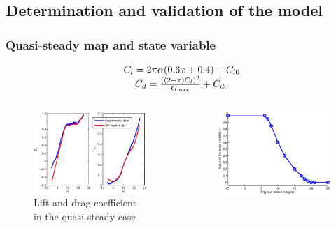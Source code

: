 \documentclass[compress]{beamer}
\begin{document}
\subsection{Determination and validation of the model}

\begin{frame}
  \frametitle{Quasi-steady map and state variable}
  \begin{equation*}
    \begin{array}[c]{c}
      C_l=2 \pi \alpha (0.6 x + 0.4) + C_{l0} \\
      C_d= \frac{ \left( \left( 2 - x \right)C_l \right)^2 }{G_{\max}} + C_{d0}
    \end{array}
  \end{equation*}
  \begin{columns}
    \begin{figure}[h]
      \begin{center}
	\includegraphics[width=1\textwidth]{./Figures/Cd_and_Cl_NACA0009.eps}
      \end{center}
      \caption{Lift and drag coefficient in the quasi-steady case}
    \end{figure}
    \begin{figure}[ht]
      \begin{center}
	\includegraphics[width=1\textwidth]{./Figures/x_0_vs_alpha.eps}

\end{center}
\end{figure}
\end{columns}
\end{frame}
\end{document}
